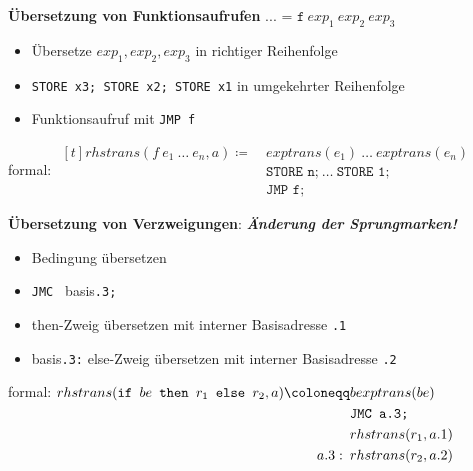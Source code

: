 \documentclass{beamer}
\begin{document}
\begin{frame}
	\footnotesize

	\textbf{Übersetzung von Funktionsaufrufen} $\texttt{... = f} \ {exp_1} \ {exp_2} \ {exp_3}$
	\begin{itemize}
		\item Übersetze $exp_1, exp_2, exp_3$ \hfill in richtiger Reihenfolge
		\item \texttt{STORE x3; STORE x2; STORE x1} \hfill in umgekehrter Reihenfolge
		\item Funktionsaufruf mit \texttt{JMP f}
	\end{itemize}

	formal: $\begin{aligned}[t]
		rhstrans(f \ e_1 \ \dots \ e_n, a) \coloneqq \ &exptrans(e_1) \ \dots \ exptrans(e_n) \\
		&\texttt{STORE n;} \ \dots \ \texttt{STORE 1;} \\
		&\texttt{JMP f;}
	\end{aligned}$
	\pause
	
	\textbf{Übersetzung von Verzweigungen}: 	
	\hfill \alert{\textit{\textbf{Änderung der Sprungmarken!}}}
	\begin{itemize}
		\item Bedingung übersetzen
		\item \texttt{JMC } basis\texttt{.3;}
		\item then-Zweig übersetzen mit interner Basisadresse \texttt{.1}
		\item basis\texttt{.3:} else-Zweig übersetzen mit interner Basisadresse \texttt{.2}
	\end{itemize}
	formal: $\begin{aligned}[t]
		rhstrans(\texttt{if } be \texttt{ then } r_1 \texttt{ else } r_2, a) \coloneqq
		&bexptrans(be) \\
		&\texttt{JMC a.3;} \\
		&rhstrans(r_1, a.1) \\
		a.3: \enskip &rhstrans(r_2, a.2)
	\end{aligned}$
\end{frame}
\end{document}
